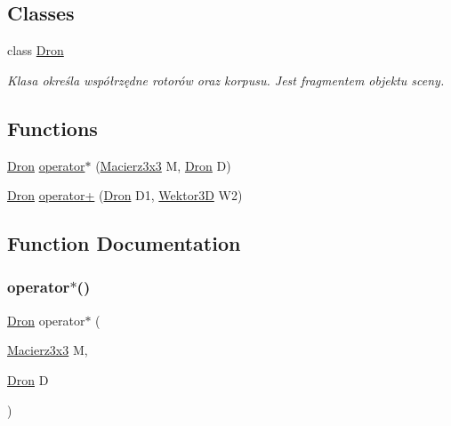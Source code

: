 \subsection*{Classes}
\begin{DoxyCompactItemize}
\item 
class \hyperlink{class_dron}{Dron}
\begin{DoxyCompactList}\small\item\em Klasa określa współrzędne rotorów oraz korpusu. Jest fragmentem objektu sceny. \end{DoxyCompactList}\end{DoxyCompactItemize}
\subsection*{Functions}
\begin{DoxyCompactItemize}
\item 
\hyperlink{class_dron}{Dron} \hyperlink{_dron_8hh_a8f9219ec11c21cfdb4178a3ccac3ccc8}{operator$\ast$} (\hyperlink{_macierz3x3_8hh_ad4fc7b0e263d9a99ba6174f68b52ea87}{Macierz3x3} M, \hyperlink{class_dron}{Dron} D)
\item 
\hyperlink{class_dron}{Dron} \hyperlink{_dron_8hh_a81962db5d5d03dc7f8ff67724c88b57d}{operator+} (\hyperlink{class_dron}{Dron} D1, \hyperlink{_wektor3_d_8hh_ac353a272b38b4ad342f7181ad7bdb91a}{Wektor3D} W2)
\end{DoxyCompactItemize}


\subsection{Function Documentation}
\mbox{\label{_dron_8hh_a8f9219ec11c21cfdb4178a3ccac3ccc8}} 
\subsubsection{\texorpdfstring{operator$\ast$()}{operator*()}}
{\footnotesize\ttfamily \hyperlink{class_dron}{Dron} operator$\ast$ (\begin{DoxyParamCaption}\item[{\hyperlink{_macierz3x3_8hh_ad4fc7b0e263d9a99ba6174f68b52ea87}{Macierz3x3}}]{M,  }\item[{\hyperlink{class_dron}{Dron}}]{D }\end{DoxyParamCaption})}

